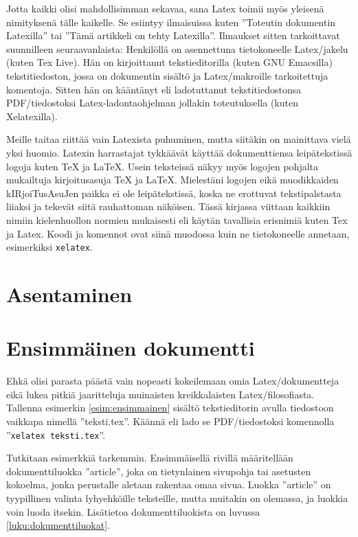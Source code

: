 \documentclass[a4paper,10pt,notitlepage,oneside]{book}
\newcommand{\koodi}[1]{\texttt{#1}}
\begin{document}
Jotta kaikki olisi mahdollisimman sekavaa, sana Latex toimii myös
yleisenä nimityksenä tälle kaikelle. Se esiintyy ilmaisuissa kuten
''Toteutin dokumentin Latexilla'' tai ''Tämä artikkeli on tehty
Latexilla''. Ilmaukset sitten tarkoittavat suunnilleen seuraavanlaista:
Henkilöllä on asennettuna tietokoneelle Latex\-/jakelu (kuten Tex Live).
Hän on kirjoittanut teksti\-editorilla (kuten GNU Emacsilla)
tekstitiedoston, jossa on dokumentin sisältö ja Latex\-/makroille
tarkoitettuja komentoja. Sitten hän on kääntänyt eli ladotuttanut
tekstitiedostonsa PDF\-/tiedostoksi Latex-la\-don\-ta\-oh\-jel\-man
jollakin toteutuksella (kuten Xelatexilla).

Meille \marginpar{\Large\LaTeX} taitaa riittää vain Latexista puhuminen,
mutta siitäkin on mainittava vielä yksi huomio. Latexin harrastajat
tykkäävät käyttää dokumenttiensa leipätekstissä logoja kuten \TeX{} ja
\LaTeX{}. Usein teksteissä näkyy myös logojen pohjalta mukailtuja
kirjoitus\-asuja TeX ja LaTeX. Mielestäni logojen eikä muodikkaiden
kIRjoiTus\-AsuJen paikka ei ole leipätekstissä, koska ne erottuvat
tekstipalstasta liiaksi ja tekevät siitä rauhattoman näköisen. Tässä
kirjassa viittaan kaikkiin nimiin kielenhuollon normien mukaisesti eli
käytän tavallisia erisnimiä kuten Tex ja Latex. Koodi ja komennot ovat
siinä muodossa kuin ne tietokoneelle annetaan, esimerkiksi
\koodi{xelatex}.

\section{Asentaminen}
\label{luku:asentaminen}

\section{Ensimmäinen dokumentti}

Ehkä olisi parasta päästä vain nopeasti kokeilemaan omia
Latex\-/dokumentteja eikä lukea pitkiä jaaritteluja muinaisten
kreikkalaisten Latex\-/filosofiasta. Tallenna esimerkin
\ref{esim:ensimmainen} sisältö teksti\-editorin avulla tiedostoon
vaikkapa nimellä ''teksti.tex''. Käännä eli lado se PDF\-/tiedostoksi
komennolla ''\koodi{xelatex teksti.tex}''.

Tutkitaan esimerkkiä tarkemmin. Ensimmäisellä rivillä määritellään
dokumenttiluokka ''\textenglish{article}'', joka on tietynlainen
sivupohja tai asetusten kokoelma, jonka perustalle aletaan rakentaa omaa
sivua. Luokka ''article'' on tyypillinen valinta lyhyehköille
teksteille, mutta muitakin on olemassa, ja luokkia voin luoda itsekin.
Lisätietoa dokumenttiluokista on luvussa \ref{luku:dokumenttiluokat}.
\end{document}
